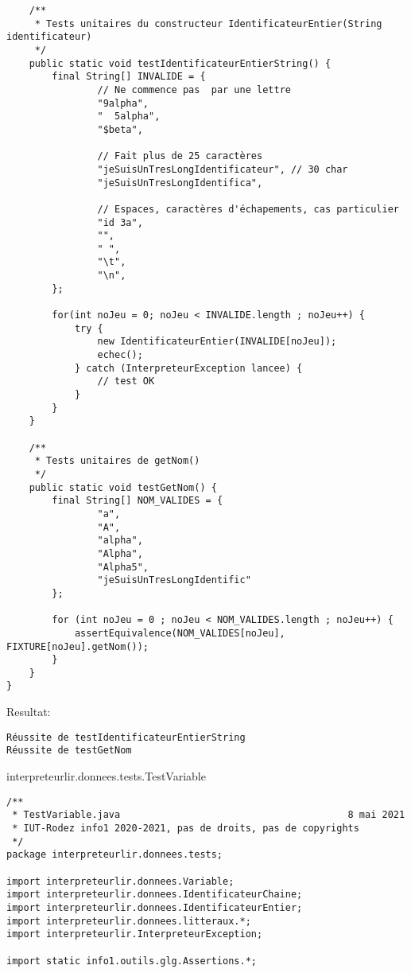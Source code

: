 \begin{enum}
\begin{verbatim}
    /**
     * Tests unitaires du constructeur IdentificateurEntier(String identificateur)
     */
    public static void testIdentificateurEntierString() {
        final String[] INVALIDE = {
                // Ne commence pas  par une lettre
                "9alpha",
                "  5alpha",
                "$beta",

                // Fait plus de 25 caractères
                "jeSuisUnTresLongIdentificateur", // 30 char
                "jeSuisUnTresLongIdentifica",

                // Espaces, caractères d'échapements, cas particulier
                "id 3a",
                "",
                " ",
                "\t",
                "\n",
        };

        for(int noJeu = 0; noJeu < INVALIDE.length ; noJeu++) {
            try {
                new IdentificateurEntier(INVALIDE[noJeu]);
                echec();
            } catch (InterpreteurException lancee) {
                // test OK
            }
        }
    }

    /**
     * Tests unitaires de getNom()
     */
    public static void testGetNom() {
        final String[] NOM_VALIDES = {
                "a",
                "A",
                "alpha",
                "Alpha",
                "Alpha5",
                "jeSuisUnTresLongIdentific"
        };

        for (int noJeu = 0 ; noJeu < NOM_VALIDES.length ; noJeu++) {
            assertEquivalence(NOM_VALIDES[noJeu], FIXTURE[noJeu].getNom());
        }
    }
}
\end{verbatim}
Resultat:
\begin{verbatim}
Réussite de testIdentificateurEntierString
Réussite de testGetNom
\end{verbatim}


    \item interpreteurlir.donnees.tests.TestVariable
\begin{verbatim}
/**
 * TestVariable.java                                        8 mai 2021
 * IUT-Rodez info1 2020-2021, pas de droits, pas de copyrights
 */
package interpreteurlir.donnees.tests;

import interpreteurlir.donnees.Variable;
import interpreteurlir.donnees.IdentificateurChaine;
import interpreteurlir.donnees.IdentificateurEntier;
import interpreteurlir.donnees.litteraux.*;
import interpreteurlir.InterpreteurException;

import static info1.outils.glg.Assertions.*;


\end{verbatim}
\end{enum}
